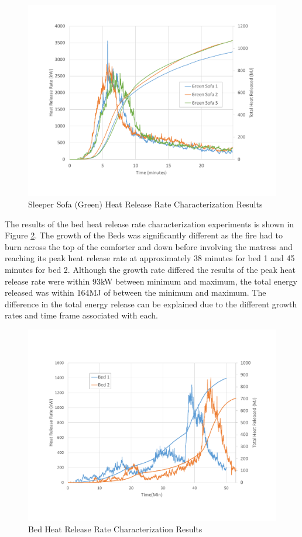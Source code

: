 \documentclass{article}
\begin{document}
\begin{figure}[H]
	\centering
	\includegraphics[height=0.45\textheight]{0_Images/Furniture/Sofa_Green_HRR.pdf}
	\caption{Sleeper Sofa (Green) Heat Release Rate Characterization Results}
	\label{fig:SofaGreenHRR}
\end{figure}

\clearpage

The results of the bed heat release rate characterization experiments is shown in Figure \ref{fig:BedHRR}. The growth of the Beds was significantly different as the fire had to burn across the top of the comforter and down before involving the matress and reaching its peak heat release rate at approximately 38 minutes for bed 1 and 45 minutes for bed 2. Although the growth rate differed the results of the peak heat release rate were within 93kW between minimum and maximum, the total energy released was within 164MJ of between the minimum and maximum. The difference in the total energy release can be explained due to the different growth rates and time frame associated with each.

\begin{figure}[H]
	\centering
	\includegraphics[height=0.45\textheight]{0_Images/Furniture/Bed_HRR.pdf}
	\caption{Bed Heat Release Rate Characterization Results}
	\label{fig:BedHRR}
\end{figure}
\end{document}
